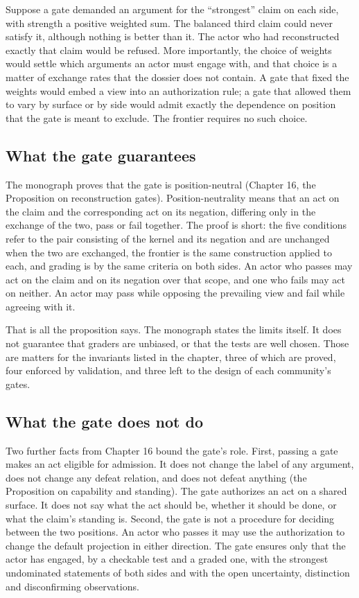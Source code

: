 \documentclass[11pt]{article}
\begin{document}
Suppose a gate demanded an argument for the ``strongest'' claim on each side, with strength a positive weighted sum. The balanced third claim could never satisfy it, although nothing is better than it. The actor who had reconstructed exactly that claim would be refused. More importantly, the choice of weights would settle which arguments an actor must engage with, and that choice is a matter of exchange rates that the dossier does not contain. A gate that fixed the weights would embed a view into an authorization rule; a gate that allowed them to vary by surface or by side would admit exactly the dependence on position that the gate is meant to exclude. The frontier requires no such choice.

\subsection{What the gate guarantees}

The monograph proves that the gate is position-neutral (Chapter 16, the Proposition on reconstruction gates). Position-neutrality means that an act on the claim and the corresponding act on its negation, differing only in the exchange of the two, pass or fail together. The proof is short: the five conditions refer to the pair consisting of the kernel and its negation and are unchanged when the two are exchanged, the frontier is the same construction applied to each, and grading is by the same criteria on both sides. An actor who passes may act on the claim and on its negation over that scope, and one who fails may act on neither. An actor may pass while opposing the prevailing view and fail while agreeing with it.

That is all the proposition says. The monograph states the limits itself. It does not guarantee that graders are unbiased, or that the tests are well chosen. Those are matters for the invariants listed in the chapter, three of which are proved, four enforced by validation, and three left to the design of each community's gates.

\subsection{What the gate does not do}

Two further facts from Chapter 16 bound the gate's role. First, passing a gate makes an act eligible for admission. It does not change the label of any argument, does not change any defeat relation, and does not defeat anything (the Proposition on capability and standing). The gate authorizes an act on a shared surface. It does not say what the act should be, whether it should be done, or what the claim's standing is. Second, the gate is not a procedure for deciding between the two positions. An actor who passes it may use the authorization to change the default projection in either direction. The gate ensures only that the actor has engaged, by a checkable test and a graded one, with the strongest undominated statements of both sides and with the open uncertainty, distinction and disconfirming observations.
\end{document}
